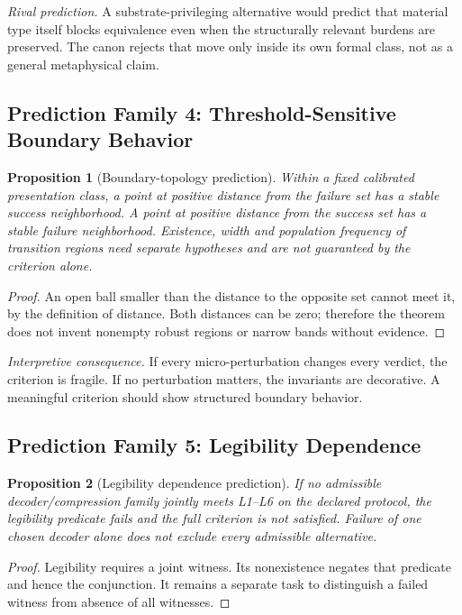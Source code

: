 \documentclass[11pt,a4paper]{article}
\newtheorem{proposition}{Proposition}[section]
\begin{document}
\noindent\textit{Rival prediction.} A substrate-privileging alternative would predict that material type itself blocks equivalence even when the structurally relevant burdens are preserved. The canon rejects that move only inside its own formal class, not as a general metaphysical claim.

\subsection{Prediction Family 4: Threshold-Sensitive Boundary Behavior}
\begin{proposition}[Boundary-topology prediction]\label{prop:boundary-contract}
Within a fixed calibrated presentation class, a point at positive distance from the failure set has a stable success neighborhood. A point at positive distance from the success set has a stable failure neighborhood. Existence, width and population frequency of transition regions need separate hypotheses and are not guaranteed by the criterion alone.
\end{proposition}
\begin{proof}
An open ball smaller than the distance to the opposite set cannot meet it, by the definition of distance. Both distances can be zero; therefore the theorem does not invent nonempty robust regions or narrow bands without evidence.
\end{proof}

\noindent\textit{Interpretive consequence.} If every micro-perturbation changes every verdict, the criterion is fragile. If no perturbation matters, the invariants are decorative. A meaningful criterion should show structured boundary behavior.

\subsection{Prediction Family 5: Legibility Dependence}
\begin{proposition}[Legibility dependence prediction]\label{prop:legibility-contract}
If no admissible decoder/compression family jointly meets L1--L6 on the declared protocol, the legibility predicate fails and the full criterion is not satisfied. Failure of one chosen decoder alone does not exclude every admissible alternative.
\end{proposition}
\begin{proof}
Legibility requires a joint witness. Its nonexistence negates that predicate and hence the conjunction. It remains a separate task to distinguish a failed witness from absence of all witnesses.
\end{proof}
\end{document}
